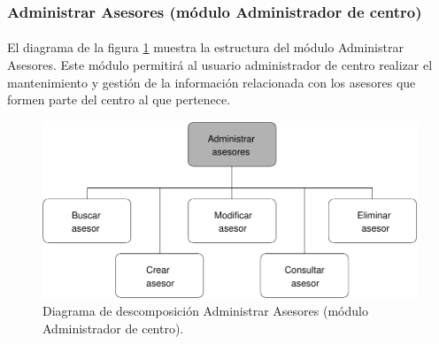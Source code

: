 \subsubsection{Administrar Asesores (módulo Administrador de centro)}

  \paragraph{}El diagrama de la figura
  \ref{diagramaDescomposicionAdministrarAsesores-admCentro} muestra la
  estructura del módulo Administrar Asesores. Este módulo permitirá al usuario
  administrador de centro realizar el mantenimiento y gestión de la información
  relacionada con los asesores que formen parte del centro al que pertenece.

  \begin{figure}[!ht]
    \begin{center}
      \includegraphics[]{11.Disenyo_Arquitectonico/11.2.Diagramas_Descomposicion/11.2.3.Modulo_administrador_centro/AdministrarBBDD/AdministrarUsuarios/AdministrarAsesores/Diagramas/administrar_asesores.pdf}
      \caption{Diagrama de descomposición Administrar Asesores (módulo Administrador de centro).}
      \label{diagramaDescomposicionAdministrarAsesores-admCentro}
    \end{center}
  \end{figure}
